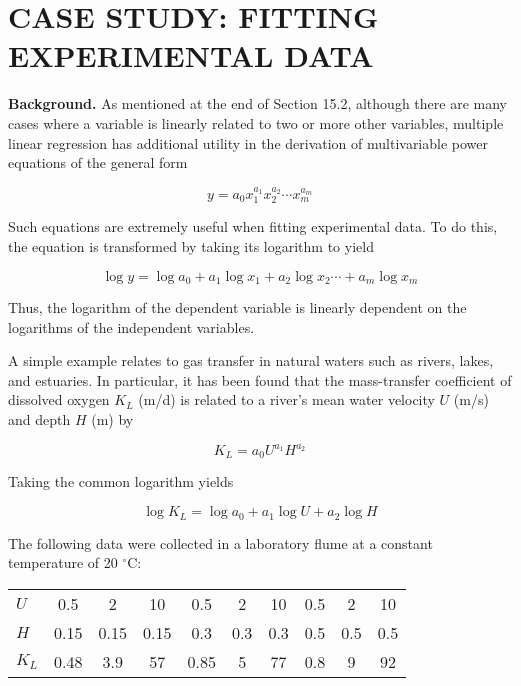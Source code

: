 \documentclass[../main.tex]{subfiles}
\begin{document}
\section[CASE STUDY: FITTING EXPERIMENTAL DATA]{CASE STUDY: FITTING EXPERIMENTAL DATA}
\noindent\textbf{Background.} \quad As mentioned at the end of Section 15.2, although there are many cases where a variable is linearly related to two or more other variables, multiple linear regression has additional utility in the derivation of multivariable power equations of the general form

\begin{equation}
	\tag{15.14}
	y = a_0 x_1^{a_1} x_2^{a_2} \cdots x_m^{a_m} 
\end{equation}

\noindent Such equations are extremely useful when fitting experimental data. To do this, the equation is transformed by taking its logarithm to yield

\begin{equation}
	\tag{15.15}
	\log y = \log a_0 + a_1 \log x_1 + a_2 \log x_2 \cdots + a_m \log x_m
\end{equation}

\noindent Thus, the logarithm of the dependent variable is linearly dependent on the logarithms of the independent variables.

A simple example relates to gas transfer in natural waters such as rivers, lakes, and estuaries. In particular, it has been found that the mass-transfer coefficient of dissolved oxygen $K_L$ (m/d) is related to a river's mean water velocity $U$ (m/s) and depth $H$ (m) by

\begin{equation}
	\tag{15.16}
	K_L = a_0 U^{a_1} H^{a_2}
\end{equation}

\noindent Taking the common logarithm yields

\begin{equation}
	\tag{15.17}
	\log K_L = \log a_0 + a_1 \log U + a_2 \log H
\end{equation}

The following data were collected in a laboratory flume at a constant temperature of 20 $^\circ$C:

\begin{tabular}{l c c c c c c c c c}
	$U$ & 0.5 & 2 & 10 & 0.5 & 2 & 10 & 0.5 & 2 & 10 \\
	$H$ & 0.15 & 0.15 & 0.15 & 0.3 & 0.3 & 0.3 & 0.5 & 0.5 & 0.5 \\
	$K_L$ & 0.48 & 3.9 & 57 & 0.85 & 5 & 77 & 0.8 & 9 & 92
\end{tabular}
\end{document}
